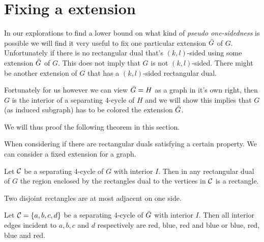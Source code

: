 
\section{Fixing a extension}
  In our explorations to find a lower bound on what kind of \emph{pseudo one-sidedness} is possible we will find it very useful to fix one particular extension $\bar{G}$ of $G$. Unfortunately if there is no rectangular dual that's $(k,l)$-sided using some extension $\bar{G}$ of $G$. This does not imply that $G$ is not $(k,l)$-sided. There might be another extension of $G$ that has a $(k,l)$-sided rectangular dual.

  Fortunately for us however we can view $\bar{G} = H$ as a graph in it's own right, then $G$ is the interior of a separating $4$-cycle of $H$ and we will show this implies that $G$ (as induced subgraph) has to be colored  the extension $\bar{G}$.

  We will thus proof the following theorem in this section.
  \begin{thrm}
  \label{th:fixExtension}
  When considering if there are rectangular duals satisfying a certain property. We can consider a fixed extension for a graph.
  \end{thrm}

  \begin{remark}
  \label{re:interiorRectangle}
  Let $\mathcal{C}$ be a separating $4$-cycle of $G$ with interior $I$. Then in any rectangular dual of $G$ the region enclosed by the rectangles dual to the vertices in $\mathcal{C}$ is a rectangle.
  \end{remark}

  \begin{remark}
  \label{re:disjointRectanglesOnlyHaveOneAdjecentSide}
  Two disjoint rectangles are at most adjacent on one side.
  \end{remark}

  \begin{lemma}
  \label{lm:fix:fourCycleInteriorColor}
  Let $\mathcal{C} = \left\lbrace {a, b, c, d} \right\rbrace$ be a separating $4$-cycle of $\bar{G}$ with interior $I$. Then all interior edges incident to $a, b, c$ and $d$ respectively are red, blue, red and blue or blue, red, blue and red.
  \end{lemma}


